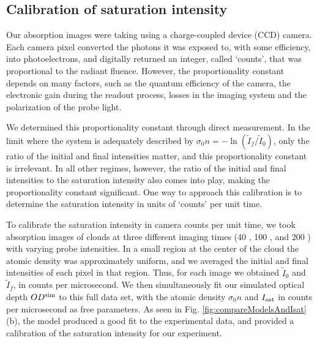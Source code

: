 \documentclass[12pt]{iopart}
\begin{document}
\subsection{Calibration of saturation intensity}
Our absorption images were taking using a charge-coupled device (CCD) camera.  Each camera pixel  converted the photons it was exposed to, with some efficiency, into photoelectrons, and digitally returned an integer, called `counts', that was proportional to the radiant fluence.  However, the proportionality constant depends on many factors, such as the quantum efficiency of the camera, the electronic gain during the readout process, losses in the imaging system and the polarization of the probe light.
\par We determined this proportionality constant through direct measurement. In the limit where the system is adequately described by $\sigma_0 n=-\ln(\tilde{I}_f/\tilde{I}_0)$, only the ratio of the initial and final intensities matter, and this proportionality constant is irrelevant. In all other regimes, however, the ratio of the initial and final intensities to the saturation intensity also comes into play, making the proportionality constant significant. One way to approach this calibration is to determine the saturation intensity in units of `counts' per unit time.
\par To calibrate the saturation intensity in camera counts per unit time, we took absorption images of \K{} clouds at three different imaging times (40 \us{}, 100 \us{}, and 200 \us{}) with varying probe intensities. In a small region at the center of the cloud the atomic density was approximately uniform, and we averaged the initial and final intensities of each pixel in that region. Thus, for each image we obtained $\tilde{I}_0$ and $\tilde{I}_f$, in counts per microsecond. We then simultaneously fit our simulated optical depth  $OD^{\rm{sim}}$ to this full data set, with the atomic density $\sigma_0 n$ and  $I_{\rm{sat}}$ in counts per microsecond as free parameters. As seen in Fig. \ref{fig:compareModelsAndIsat}(b), the model produced a good fit to the experimental data, and provided a calibration of the saturation intensity for our experiment.
\end{document}
